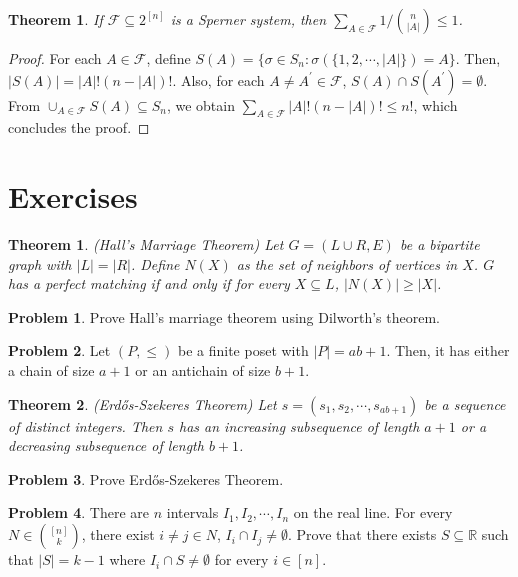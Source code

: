 \documentclass[11pt]{article}
\newtheorem{theorem}{Theorem}
\newtheorem*{theorem*}{Theorem}
\theoremstyle{definition}
\newtheorem{problem}{Problem}
\begin{document}
	\begin{theorem}
		If $\mathcal{F} \subseteq 2^{[n]}$ is a Sperner system, then $\sum_{A \in \mathcal{F}} 1/{n \choose |A|} \leq 1$.
	\end{theorem}

	\begin{proof}
		For each $A \in \mathcal{F}$, define $S(A) = \{ \sigma \in S_n : \sigma(\{1, 2, \cdots, |A|\}) = A \}$.
		Then, $|S(A)| = |A|!(n-|A|)!$.
		Also, for each $A \neq A^{\prime} \in \mathcal{F}$, $S(A) \cap S(A^{\prime}) = \emptyset$.
		From $\cup_{A \in \mathcal{F}} S(A) \subseteq S_n$, we obtain $\sum_{A \in \mathcal{F}} |A|! (n-|A|)! \leq n!$, which concludes the proof.
	\end{proof}
	
	\newpage
	
	\section*{Exercises}
	
	\begin{theorem*}(Hall's Marriage Theorem)
		Let $G = (L \cup R, E)$ be a bipartite graph with $|L| = |R|$.
		Define $N(X)$ as the set of neighbors of vertices in $X$.
		$G$ has a perfect matching if and only if for every $X \subseteq L$, $|N(X)| \geq |X|$.
	\end{theorem*}
	
	\begin{problem}
		Prove Hall's marriage theorem using Dilworth's theorem.
	\end{problem}
	
	\begin{problem}
		Let $(P, \leq)$ be a finite poset with $|P| = ab+1$. Then, it has either a chain of size $a+1$ or an antichain of size $b+1$.
	\end{problem}
	
	\begin{theorem*}(Erd\H{o}s-Szekeres Theorem)
		Let $s = (s_1, s_2, \cdots, s_{ab+1})$ be a sequence of distinct integers.
		Then $s$ has an increasing subsequence of length $a+1$ or a decreasing subsequence of length $b+1$.
	\end{theorem*}
	
	\begin{problem}
		Prove Erd\H{o}s-Szekeres Theorem.
	\end{problem}
	
	\begin{problem}
		There are $n$ intervals $I_1, I_2, \cdots, I_n$ on the real line.
		For every $N \in {[n] \choose k}$, there exist $i \neq j \in N$, $I_i \cap I_j \neq \emptyset$.
		Prove that there exists $S \subseteq \mathbb{R}$ such that $|S| = k-1$ where $I_i \cap S \neq \emptyset$ for every $i \in [n]$.
	\end{problem}
	
\end{document}
